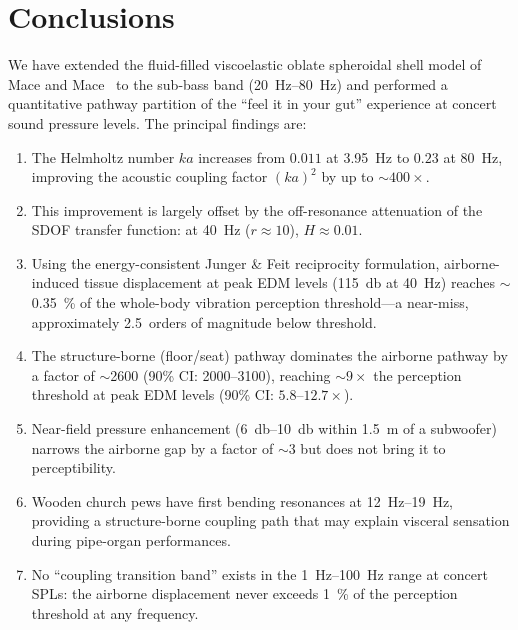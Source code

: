 \section{Conclusions}
\label{sec:conclusions}

We have extended the fluid-filled viscoelastic oblate spheroidal shell
model of Mace and Mace~\cite{Mace2026browntone} to the sub-bass band
(\SIrange{20}{80}{\hertz}) and performed a quantitative pathway partition
of the ``feel it in your gut'' experience at concert sound pressure
levels.  The principal findings are:
%
\begin{enumerate}
  \item The Helmholtz number $ka$ increases from $0.011$ at
    \SI{3.95}{\hertz} to $0.23$ at \SI{80}{\hertz}, improving the
    acoustic coupling factor $(ka)^2$ by up to ${\sim}400\times$.

  \item This improvement is largely offset by the off-resonance
    attenuation of the SDOF transfer function: at \SI{40}{\hertz}
    ($r \approx 10$), $H \approx 0.01$.

  \item Using the energy-consistent Junger \& Feit reciprocity
    formulation, airborne-induced tissue displacement at peak EDM levels
    (\SI{115}{\decibel} at \SI{40}{\hertz}) reaches
    $\sim$\SI{0.35}{\percent} of the whole-body vibration perception
    threshold---a near-miss, approximately \num{2.5}~orders of magnitude
    below threshold.

  \item The structure-borne (floor/seat) pathway dominates the airborne
    pathway by a factor of $\sim$\num{2600}
    (90\% CI: \numrange{2000}{3100}), reaching $\sim 9\times$ the
    perception threshold at peak EDM levels (90\% CI:
    $5.8$--$12.7\times$).

  \item Near-field pressure enhancement (\SIrange{6}{10}{\decibel}
    within \SI{1.5}{\metre} of a subwoofer) narrows the airborne gap
    by a factor of $\sim$3 but does not bring it to perceptibility.

  \item Wooden church pews have first bending resonances at
    \SIrange{12}{19}{\hertz}, providing a structure-borne coupling
    path that may explain visceral sensation during pipe-organ
    performances.

  \item No ``coupling transition band'' exists in the
    \SIrange{1}{100}{\hertz} range at concert SPLs: the airborne
    displacement never exceeds \SI{1}{\percent} of the perception
    threshold at any frequency.
\end{enumerate}

